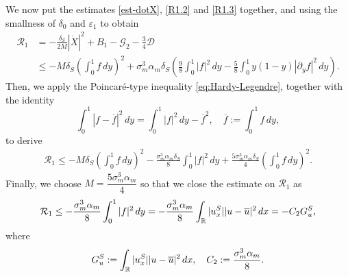 \documentclass[11pt,reqno]{amsart}
\begin{document}
We now put the estimates \eqref{est-dotX}, \eqref{R1.2} and \eqref{R1.3} together, and using the smallness of $\delta_0$ and $\varepsilon_1$ to obtain
\begin{align*} 
\mathcal{R}_1&= -\frac{\delta_S}{2M}|\dot{X}|^2+B_1-\mathcal{G}_2-\frac{3}{4}\mathcal{D} \\
&\le -M \delta_S \left(\int_0^1 f \, dy \right)^2 + \sigma_m^3 \alpha_m \delta_S \left(   \frac{9}{8} \int_0^1 |f|^2 \, dy -\frac{5}{8}  \int_0^1 y(1-y) |\partial_y f|^2 \, dy \right).
\end{align*}
Then, we apply the Poincar\'e-type inequality \eqref{eq:Hardy-Legendre}, together with the identity
\[\int_0^1 |f-\overline{f}|^2 \, dy=\int_0^1 |f|^2 \, dy-\overline{f}^2, \quad \overline{f}:=\int_0^1 f \, dy,\]
to derive
\begin{align*}
	\mathcal{R}_1 \le -M \delta_S \left(\int_0^1 f \, dy \right)^2 -\frac{\sigma_m^3 \alpha_m \delta_S}{8} \int_0^1 |f|^2 \, dy + \frac{5 \sigma_m^3 \alpha_m \delta_S}{4} \left(\int_0^1 f\,dy\right)^2.
\end{align*}
Finally, we choose $M=\dfrac{5 \sigma_m^3 \alpha_m}{4}$ so that we close the estimate on $\mathcal{R}_1$ as 
\begin{equation}\label{R1}
	\mathcal{R}_1 \le  -\frac{\sigma_m^3 \alpha_m }{8} \int_0^1 |f|^2 \, dy = -\frac{\sigma_m^3\alpha_m}{8}\int_{\mathbb{R}}|u^S_x||u-\overline{u}|^2\,dx=-C_2 G^S_u,
\end{equation}
where
\begin{equation*}
	\begin{aligned}
	G^S_u :=  \int_\mathbb{R} |u^S_x| |u-\overline{u}|^2 \, dx, \quad C_2:=\frac{\sigma_m^3 \alpha_m }{8}.
	\end{aligned}
\end{equation*}
\end{document}
